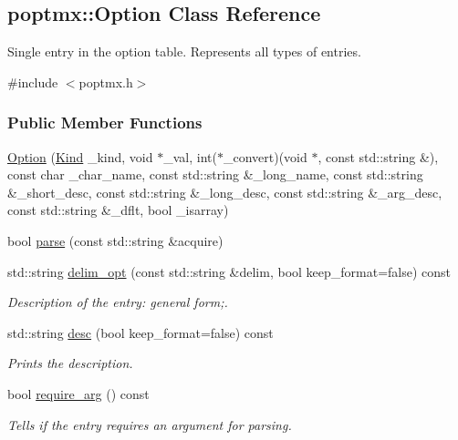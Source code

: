 \hypertarget{classpoptmx_1_1Option}{
\subsection{poptmx::Option Class Reference}
\label{classpoptmx_1_1Option}
}


Single entry in the option table. Represents all types of entries.  




{\ttfamily \#include $<$poptmx.h$>$}

\subsubsection*{Public Member Functions}
\begin{DoxyCompactItemize}
\item 
\hyperlink{classpoptmx_1_1Option_a1009f4c6ace91c6419f91f53acc9b243}{Option} (\hyperlink{group__poptmx_ga3f58821f631b466567d001183ca437e2}{Kind} \_\-kind, void $\ast$\_\-val, int($\ast$\_\-convert)(void $\ast$, const std::string \&), const char \_\-char\_\-name, const std::string \&\_\-long\_\-name, const std::string \&\_\-short\_\-desc, const std::string \&\_\-long\_\-desc, const std::string \&\_\-arg\_\-desc, const std::string \&\_\-dflt, bool \_\-isarray)
\item 
bool \hyperlink{classpoptmx_1_1Option_a6f76ad546a5b2e462d3160780db742ff}{parse} (const std::string \&acquire)
\item 
std::string \hyperlink{classpoptmx_1_1Option_a9c2e5a25f4d22431a26dbe24e4d4c57a}{delim\_\-opt} (const std::string \&delim, bool keep\_\-format=false) const 
\begin{DoxyCompactList}\small\item\em Description of the entry: general form;. \item\end{DoxyCompactList}\item 
std::string \hyperlink{classpoptmx_1_1Option_a140a93bae36cb44428d7558310c058e2}{desc} (bool keep\_\-format=false) const 
\begin{DoxyCompactList}\small\item\em Prints the description. \item\end{DoxyCompactList}\item 
bool \hyperlink{classpoptmx_1_1Option_a7c474aec9ff90f3b7860fea4d6e4b08f}{require\_\-arg} () const 
\begin{DoxyCompactList}\small\item\em Tells if the entry requires an argument for parsing. \item\end{DoxyCompactList}\item 

\end{DoxyCompactItemize}
